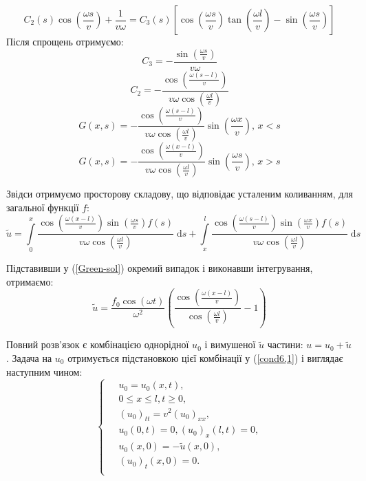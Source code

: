 \begin{enumerate}
  \begin{equation*}
    C_2(s) \cos\left(\frac{\omega s}{v}\right) + \frac{1}{v\omega} = C_3(s) \left[\cos\left(\frac{\omega s}{v}\right) \tan\left(\frac{\omega l}{v}\right) - \sin\left(\frac{\omega s}{v}\right)\right]
  \end{equation*}
  Після спрощень отримуємо:
  \begin{equation*}
    C_3 = -\frac{\sin\left(\frac{\omega s}{v}\right)}{v\omega}
  \end{equation*}
  \begin{equation*}
    C_2 = -\frac{\cos\left(\frac{\omega(s-l)}{v}\right)}{v\omega \cos\left(\frac{\omega l}{v}\right)}
  \end{equation*}
  \begin{equation*}
    G(x,s) = -\frac{\cos\left(\frac{\omega(s-l)}{v}\right)}{v\omega\cos\left(\frac{\omega l}{v}\right)} \sin\left(\frac{\omega x}{v}\right), \, x<s 
  \end{equation*}
  \begin{equation*}
    G(x,s) = -\frac{\cos\left(\frac{\omega(x-l)}{v}\right)}{v\omega\cos\left(\frac{\omega l}{v}\right)} \sin\left(\frac{\omega s}{v}\right), \, x>s 
  \end{equation*}
\end{enumerate}

Звідси отримуємо просторову складову, що відповідає усталеним коливанням, для загальної функції $f$:
\begin{equation} \label{Green-sol}
    \tilde{u} = \int\limits_0^x \frac{\cos\left(\frac{\omega(x-l)}{v}\right) \sin\left(\frac{\omega s}{v}\right) f(s)}{v\omega\cos\left(\frac{\omega l}{v}\right)} \; \mathrm{d}s + \int\limits_x^l \frac{\cos\left(\frac{\omega (s-l)}{v}\right)\sin\left(\frac{\omega x}{v}\right) f(s)}{v\omega\cos\left(\frac{\omega l}{v}\right)} \; \mathrm{d}s
\end{equation}

Підставивши у (\ref{Green-sol}) окремий випадок і виконавши інтегрування, отримаємо:
\begin{equation}
    \tilde{u} = \frac {f_0\cos(\omega t)}{\omega^2}\left(\frac{\cos\left(\frac{\omega (x-l)}{v}\right)}{\cos\left(\frac{\omega l}{v}\right)}-1\right)
\end{equation}

Повний розв'язок є комбінацією однорідної $u_0$ і вимушеної $\tilde{u}$ частини: $u = u_0 + \tilde{u}$. Задача на $u_0$ отримується підстановкою цієї комбінації у (\ref{cond6,1}) і виглядає наступним чином: 
\begin{equation} 
    \left\{ \begin{aligned} %
            \;&u_0 = u_0(x,t), \\
            &0 \leq x \leq l, t \geq 0, \\
            &{(u_0)}_{tt}=v^2{(u_0)}_{xx}, \\
            &u_0(0,t) = 0, {(u_0)}_x(l,t) = 0,\\  
            &u_0(x,0) = -\tilde{u}(x,0),\\
            &{(u_0)}_t(x,0) = 0.\\
    \end{aligned} \right.
\end{equation}

